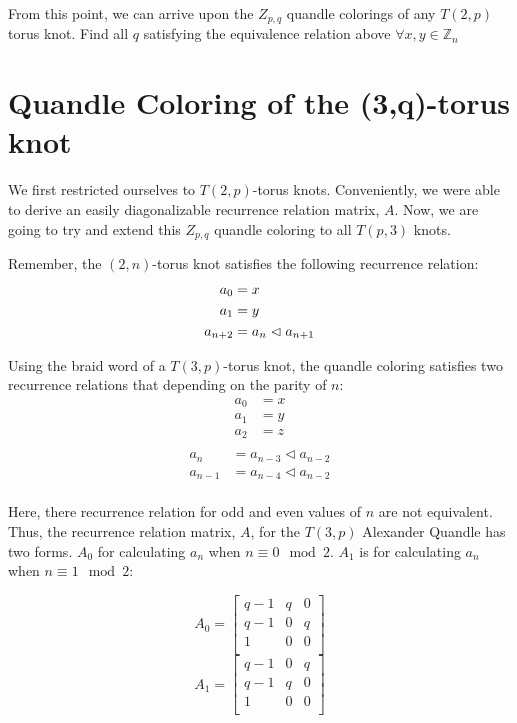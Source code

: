 \documentclass[paper.tex]{subfiles}
\begin{document}
From this point, we can arrive upon the $Z_{p,q}$ quandle colorings of any $T(2, p)$ torus knot. Find all $q$ satisfying the equivalence relation above $\forall x,y \in \mathbb{Z}_n$

\section{Quandle Coloring of the (3,q)-torus knot}\label{sec:2ntorus}
We first restricted ourselves to $T(2,p)$-torus knots. Conveniently, we were able to derive an easily diagonalizable recurrence relation matrix, $A$. Now, we are going to try and extend this $Z_{p,q}$ quandle coloring to all $T(p,3)$ knots. 

Remember, the $(2,n)$-torus knot satisfies the following recurrence relation:
\begin{align*}
	a_0 &= x \\
	a_1 &= y \\
	a_{n+2} &= a_{n} \vartriangleleft a_{n+1} \\
\end{align*}

Using the braid word of a $T(3,p)$-torus knot, the quandle coloring satisfies two recurrence relations that depending on the parity of $n$: 
\begin{align*}
	a_0 &= x \\
	a_1 &= y \\
	a_2 &= z \\
\end{align*}
\begin{align*}
	a_{n} &= a_{n-3} \triangleleft a_{n-2} \\
	a_{n-1} &= a_{n-4} \triangleleft a_{n-2} \\
\end{align*}

Here, there recurrence relation for odd and even values of $n$ are not equivalent. Thus, the recurrence relation matrix, $A$, for the $T(3, p)$ Alexander Quandle has two forms. $A_{0}$ for calculating $a_{n}$ when $n \equiv 0 \mod 2$. $A_{1}$ is for calculating $a_{n}$ when $n \equiv 1 \mod 2$:

\[ A_{0} = 
\left[ \begin{array}{ccc}
q-1 & q & 0 \\
q-1 & 0 & q \\
1 & 0 & 0 \\
\end{array} \right]
\]
\[ A_{1} = 
\left[ \begin{array}{ccc}
q-1 & 0 & q \\
q-1 & q & 0 \\
1 & 0 & 0 \\
\end{array} \right]
\]
\end{document}
